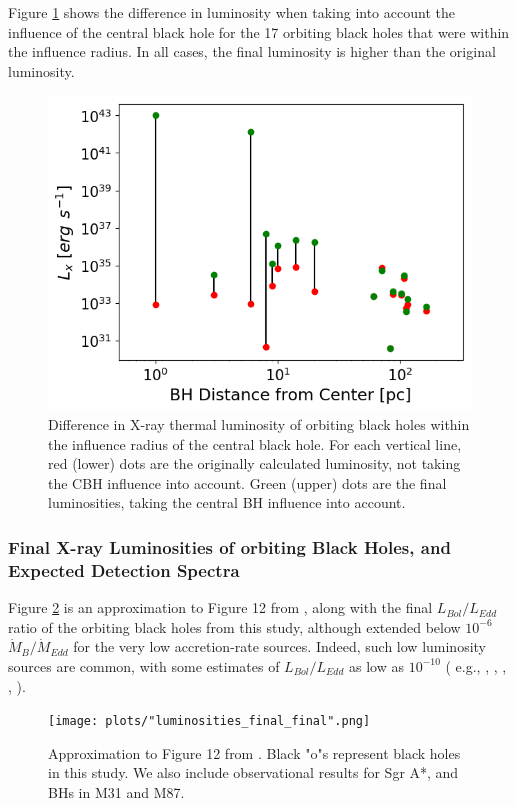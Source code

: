 \documentclass[fleqn,usenatbib,useAMS]{mnras}
\begin{document}
Figure \ref{fig:wui} shows the difference in luminosity when taking into account the influence of the central black hole for the 17 orbiting black holes that were within the influence radius.  In all cases, the final luminosity is higher than the original luminosity.
\begin{figure}
\begin{center}
\includegraphics[width=1.0\columnwidth]{plots/Comparison_of_L_x_versus_radius_with_and_without_BH_Influence.png}
\caption{Difference in X-ray thermal luminosity of orbiting black holes within the influence radius of the central black hole.  For each vertical line, red (lower) dots are the originally calculated luminosity, not taking the CBH influence into account.  Green (upper) dots are the final luminosities, taking the central BH influence into account.}
\label{fig:wui}
\end{center}
\end{figure}

\subsubsection{Final X-ray Luminosities of orbiting Black Holes, and Expected Detection Spectra}
Figure \ref{fig:loobhs} is an approximation to Figure 12 from \cite{2019MNRAS.486.5377I}, along with the final $L_{Bol}/L_{Edd}$ ratio of the orbiting black holes from this study, although extended below $10^{-6}$ $\dot{M}_{B}/\dot{M}_{Edd}$ for the very low accretion-rate sources.  Indeed, such low luminosity sources are common, with some estimates of $L_{Bol}/L_{Edd}$ as low as $10^{-10}$ ( e.g., \citealt{2003ApJ...598..301Y}, \citealt{2004ApJ...613..322Q}, \citealt{2008ARA&A..46..475H}, \citealt{2009ApJ...699..626H}, \citealt{2018MNRAS.476.1412I}).
\begin{figure}
\begin{center}
\texttt{[image: plots/"luminosities\_final\_final".png]}
\caption{Approximation to Figure 12 from \citealt{2019MNRAS.486.5377I}. Black "o"s represent black holes in this study.  We also include observational results for Sgr A*, and BHs in M31 and M87.}
\label{fig:loobhs}
\end{center}
\end{figure}
\end{document}
